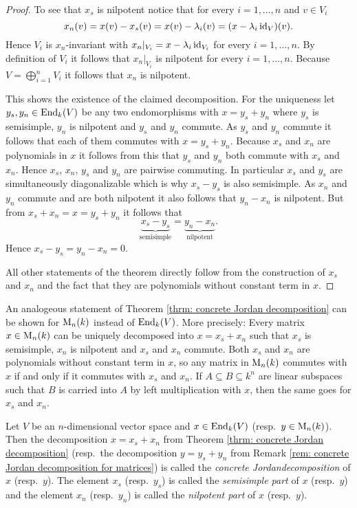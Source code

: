 \begin{proof}
 To see that $x_s$ is nilpotent notice that for every $i = 1, \dotsc, n$ and $v \in V_i$
 \[
  x_n(v) = x(v) - x_s(v) = x(v) - \lambda_i (v) = (x - \lambda_i \operatorname{id}_V)(v).
 \]
 Hence $V_i$ is $x_n$-invariant with $x_n|_{V_i} = x - \lambda_i \operatorname{id}_{V_i}$ for every $i = 1, \dotsc, n$. By definition of $V_i$ it follows that $x_n|_{V_i}$ is nilpotent for every $i = 1, \dotsc, n$. Because $V = \bigoplus_{i=1}^n V_i$ it follows that $x_n$ is nilpotent.
 
 This shows the existence of the claimed decomposition. For the uniqueness let $y_s, y_n \in \operatorname{End}_k(V)$ be any two endomorphisms with $x = y_s + y_n$ where $y_s$ is semisimple, $y_n$ is nilpotent and $y_s$ and $y_n$ commute. As $y_s$ and $y_n$ commute it follows that each of them commutes with $x = y_s + y_n$. Because $x_s$ and $x_n$ are polynomials in $x$ it follows from this that $y_s$ and $y_n$ both commute with $x_s$ and $x_n$. Hence $x_s$, $x_n$, $y_s$ and $y_n$ are pairwise commuting. In particular $x_s$ and $y_s$ are simultaneously diagonalizable which is why $x_s - y_s$ is also semisimple. As $x_n$ and $y_n$ commute and are both nilpotent it also follows that $y_n - x_n$ is nilpotent. But from $x_s + x_n = x = y_s + y_n$ it follows that
 \[
  \underbrace{x_s - y_s}_{\text{semisimple}} = \underbrace{y_n - x_n}_{\text{nilpotent}}.
 \]
 Hence $x_s - y_s = y_n - x_n = 0$.
 
 All other statements of the theorem directly follow from the construction of $x_s$ and $x_n$ and the fact that they are polynomials without constant term in $x$.
\end{proof}



\begin{rem}\label{rem: concrete Jordan decomposition for matrices}
 An analogeous statement of Theorem \ref{thrm: concrete Jordan decomposition} can be shown for $\operatorname{M}_n(k)$ instead of $\operatorname{End}_k(V)$. More precisely: Every matrix $x \in \operatorname{M}_n(k)$ can be uniquely decomposed into $x = x_s + x_n$ such that $x_s$ is semisimple, $x_n$ is nilpotent and $x_s$ and $x_n$ commute. Both $x_s$ and $x_n$ are polynomials without constant term in $x$, so any matrix in $\operatorname{M}_n(k)$ commutes with $x$ if and only if it commutes with $x_s$ and $x_n$. If $A \subseteq B \subseteq k^n$ are linear subspaces such that $B$ is carried into $A$ by left multiplication with $x$, then the same goes for $x_s$ and $x_n$.
\end{rem}


\begin{defi}
 Let $V$ be an $n$-dimensional vector space and $x \in \operatorname{End}_k(V)$ (resp.\ $y \in \operatorname{M}_n(k)$). Then the decomposition $x = x_s + x_n$ from Theorem \ref{thrm: concrete Jordan decomposition} (resp.\ the decomposition $y = y_s + y_n$ from Remark \ref{rem: concrete Jordan decomposition for matrices}) is called the \emph{concrete Jordandecomposition} of $x$ (resp.\ $y$). The element $x_s$ (resp.\ $y_s$) is called the \emph{semisimple part} of $x$ (resp.\ $y$) and the element $x_n$ (resp.\ $y_n$) is called the \emph{nilpotent part} of $x$ (resp.\ $y$).
\end{defi}


